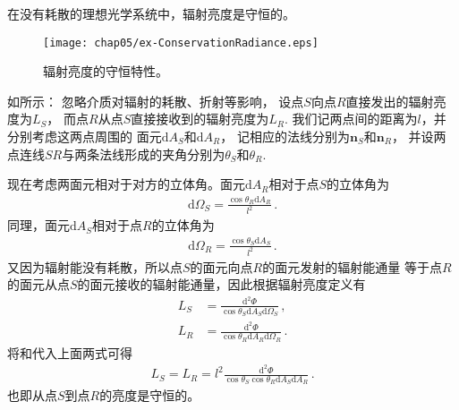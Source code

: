 \begin{proposition}
      在没有耗散的理想光学系统中，辐射亮度是守恒的。
\end{proposition}
\begin{prove}
      \begin{figure}[htbp]
            \centering
            \texttt{[image: chap05/ex-ConservationRadiance.eps]}
            \caption{辐射亮度的守恒特性。}
            \label{fig:5.ex-ConservationRadiance}
      \end{figure}
      如所示：
      忽略介质对辐射的耗散、折射等影响，
      设点$S$向点$R$直接发出的辐射亮度为$L_S$，
      而点$R$从点$S$直接接收到的辐射亮度为$L_R$.
      我们记两点间的距离为$l$，并分别考虑这两点周围的
      面元$\mathrm{d}A_S$和$\mathrm{d}A_R$，
      记相应的法线分别为${\bm n}_S$和${\bm n}_R$，
      并设两点连线$SR$与两条法线形成的夹角分别为$\theta_S$和$\theta_R$.

      现在考虑两面元相对于对方的立体角。面元$\mathrm{d}A_R$相对于点$S$的立体角为
      \begin{align}\label{eq:5.ex-source-solid-angle}
            \mathrm{d}\varOmega_S=\frac{\cos\theta_R\mathrm{d}A_R}{l^2}\, .
      \end{align}
      同理，面元$\mathrm{d}A_S$相对于点$R$的立体角为
      \begin{align}\label{eq:5.ex-receiver-solid-angle}
            \mathrm{d}\varOmega_R=\frac{\cos\theta_S\mathrm{d}A_S}{l^2}\, .
      \end{align}
      又因为辐射能没有耗散，所以点$S$的面元向点$R$的面元发射的辐射能通量
      等于点$R$的面元从点$S$的面元接收的辐射能通量，因此根据辐射亮度定义有
      \begin{align}
            L_S & =\frac{\mathrm{d}^2\varPhi}{\cos\theta_S\mathrm{d}A_S\mathrm{d}\varOmega_S}\, , \\
            L_R & =\frac{\mathrm{d}^2\varPhi}{\cos\theta_R\mathrm{d}A_R\mathrm{d}\varOmega_R}\, .
      \end{align}
      将和代入上面两式可得
      \begin{align}
            L_S=L_R=l^2\frac{\mathrm{d}^2\varPhi}{\cos\theta_S\cos\theta_R\mathrm{d}A_S\mathrm{d}A_R}\, .
      \end{align}
      也即从点$S$到点$R$的亮度是守恒的。
\end{prove}



